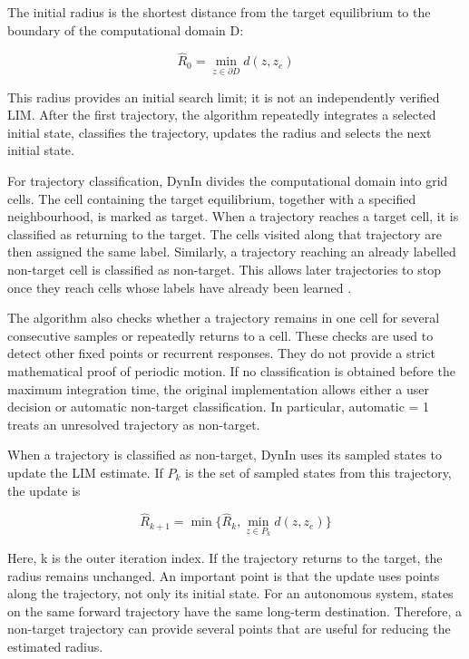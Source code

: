 The initial radius is the shortest distance from the target equilibrium to the boundary of the computational domain D:

\begin{equation}
  {\hat{R}}_{0} = \min_{z \in  \partial D} d(z, {z}_{e})
\end{equation}

This radius provides an initial search limit; it is not an independently verified LIM. After the first trajectory, the algorithm repeatedly integrates a selected initial state, classifies the trajectory, updates the radius and selects the next initial state.

For trajectory classification, DynIn divides the computational domain into grid cells. The cell containing the target equilibrium, together with a specified neighbourhood, is marked as target. When a trajectory reaches a target cell, it is classified as returning to the target. The cells visited along that trajectory are then assigned the same label. Similarly, a trajectory reaching an already labelled non-target cell is classified as non-target. This allows later trajectories to stop once they reach cells whose labels have already been learned \cite{ref12}.

The algorithm also checks whether a trajectory remains in one cell for several consecutive samples or repeatedly returns to a cell. These checks are used to detect other fixed points or recurrent responses. They do not provide a strict mathematical proof of periodic motion. If no classification is obtained before the maximum integration time, the original implementation allows either a user decision or automatic non-target classification. In particular, automatic = 1 treats an unresolved trajectory as non-target.

When a trajectory is classified as non-target, DynIn uses its sampled states to update the LIM estimate. If ${P}_{k}$ is the set of sampled states from this trajectory, the update is

\begin{equation}
  {\hat{R}}_{k+1} = \min\{{\hat{R}}_{k}, \min_{z \in  {P}_{k}} d(z, {z}_{e})\}
\end{equation}

Here, k is the outer iteration index. If the trajectory returns to the target, the radius remains unchanged. An important point is that the update uses points along the trajectory, not only its initial state. For an autonomous system, states on the same forward trajectory have the same long-term destination. Therefore, a non-target trajectory can provide several points that are useful for reducing the estimated radius.

